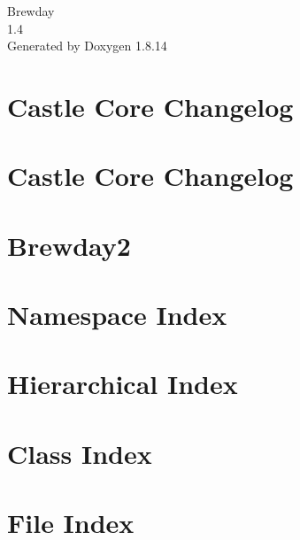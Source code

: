 \documentclass[twoside]{book}
\newcommand{\+}{\discretionary{\mbox{\scriptsize$\hookleftarrow$}}{}{}}
\newcommand{\clearemptydoublepage}{%
  \newpage{\pagestyle{empty}\cleardoublepage}%
}
\begin{document}
\hypersetup{pageanchor=false,
             bookmarksnumbered=true,
             pdfencoding=unicode
            }
\begin{titlepage}
\vspace*{7cm}
\begin{center}%
{\Large Brewday \\[1ex]\large 1.\+4 }\\
\vspace*{1cm}
{\large Generated by Doxygen 1.8.14}\\
\end{center}
\end{titlepage}
\clearemptydoublepage
{}
\tableofcontents
\clearemptydoublepage
{}
\hypersetup{pageanchor=true}

\chapter{Castle Core Changelog}
\label{md_packages__castle_8_core_84_80_80__c_h_a_n_g_e_l_o_g}

\chapter{Castle Core Changelog}
\label{md_packages__castle_8_core_84_82_81__c_h_a_n_g_e_l_o_g}

\chapter{Brewday2}
\label{md__r_e_a_d_m_e}

\chapter{Namespace Index}

\chapter{Hierarchical Index}

\chapter{Class Index}

\chapter{File Index}

\end{document}
